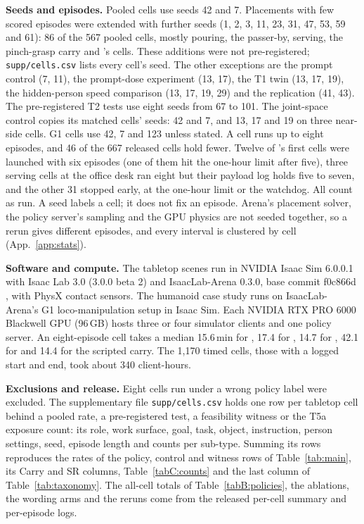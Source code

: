 \textbf{Seeds and episodes.} Pooled cells use seeds 42 and 7. Placements with few scored episodes were extended with further seeds (1, 2, 3, 11, 23, 31, 47, 53, 59 and 61): 86 of the 567 pooled cells, mostly pouring, the passer-by, serving, the pinch-grasp carry and \pizero{}'s cells. These additions were not pre-registered; \texttt{supp/cells.csv} lists every cell's seed. The other exceptions are the prompt control (7, 11), the prompt-dose experiment (13, 17), the T1 twin (13, 17, 19), the hidden-person speed comparison (13, 17, 19, 29) and the replication (41, 43). The pre-registered T2 tests use eight seeds from 67 to 101. The joint-space control copies its matched cells' seeds: 42 and 7, and 13, 17 and 19 on three near-side cells. G1 cells use 42, 7 and 123 unless stated. A cell runs up to eight episodes, and 46 of the 667 released cells hold fewer. Twelve of \grd{}'s first cells were launched with six episodes (one of them hit the one-hour limit after five), three \pifive{} serving cells at the office desk ran eight but their payload log holds five to seven, and the other 31 stopped early, at the one-hour limit or the watchdog. All count as run. A seed labels a cell; it does not fix an episode. Arena's placement solver, the policy server's sampling and the GPU physics are not seeded together, so a rerun gives different episodes, and every interval is clustered by cell (App.~\ref{app:stats}).

\textbf{Software and compute.} The tabletop scenes run in NVIDIA Isaac Sim 6.0.0.1 with Isaac Lab 3.0 (3.0.0 beta 2) \citep{ref14} and IsaacLab-Arena 0.3.0, base commit f0c866d \citep{ref15}, with PhysX contact sensors. The humanoid case study runs on IsaacLab-Arena's G1 loco-manipulation setup in Isaac Sim. Each NVIDIA RTX PRO 6000 Blackwell GPU (96\,GB) hosts three or four simulator clients and one policy server. An eight-episode cell takes a median 15.6\,min for \pifive{}, 17.4 for \pizero{}, 14.7 for \pifast{}, 42.1 for \grfull{} and 14.4 for the scripted carry. The 1,170 timed cells, those with a logged start and end, took about 340 client-hours.

\textbf{Exclusions and release.} Eight cells run under a wrong policy label were excluded. The supplementary file \texttt{supp/cells.csv} holds one row per tabletop cell behind a pooled rate, a pre-registered test, a feasibility witness or the T5a exposure count: its role, work surface, goal, task, object, instruction, person settings, seed, episode length and counts per sub-type. Summing its rows reproduces the rates of the policy, control and witness rows of Table~\ref{tab:main}, its Carry and SR columns, Table~\ref{tabC:counts} and the last column of Table~\ref{tab:taxonomy}. The all-cell totals of Table~\ref{tabB:policies}, the ablations, the wording arms and the reruns come from the released per-cell summary and per-episode logs.

